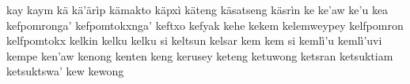 \documentclass[a4paper]{article}
\begin{document}
kay\hspace{2mm}
kaym\hspace{2mm}
kä\hspace{2mm}
kä'ärìp\hspace{2mm}
kämakto\hspace{2mm}
käpxì\hspace{2mm}
käteng\hspace{2mm}
käsatseng\hspace{2mm}
käsrìn\hspace{2mm}
ke\hspace{2mm}
ke'aw\hspace{2mm}
ke'u\hspace{2mm}
kea\hspace{2mm}
kefpomronga'\hspace{2mm}
kefpomtokxnga'\hspace{2mm}
keftxo\hspace{2mm}
kefyak\hspace{2mm}
kehe\hspace{2mm}
kekem\hspace{2mm}
kelemweypey\hspace{2mm}
kelfpomron\hspace{2mm}
kelfpomtokx\hspace{2mm}
kelkin\hspace{2mm}
kelku\hspace{2mm}
kelku si\hspace{2mm}
keltsun\hspace{2mm}
kelsar\hspace{2mm}
kem\hspace{2mm}
kem si\hspace{2mm}
kemlì'u\hspace{2mm}
kemlì'uvi\hspace{2mm}
kempe\hspace{2mm}
ken'aw\hspace{2mm}
kenong\hspace{2mm}
kenten\hspace{2mm}
keng\hspace{2mm}
kerusey\hspace{2mm}
keteng\hspace{2mm}
ketuwong\hspace{2mm}
ketsran\hspace{2mm}
ketsuktiam\hspace{2mm}
ketsuktswa'\hspace{2mm}
kew\hspace{2mm}
kewong\hspace{2mm}
\end{document}
